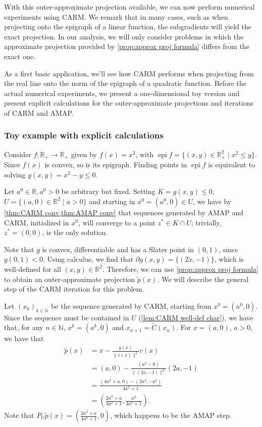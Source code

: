 \documentclass[smallextended,numbook,nospthms]{svjour3}
\theoremstyle{plain}
\theoremstyle{definition}
\def\RR{\mathds R}
\def\NN{\mathds N}
\DeclareMathOperator{\epi}{epi}
\begin{document}
With this outer-approximate projection available, we can now perform numerical experiments using CARM. We remark that in many cases, such as when projecting onto the epigraph of a linear function, the subgradients will yield the exact projection. In our analysis, we will only consider problems in which the approximate projection provided by \cref{prop:approx proj formula} differs from the exact one.

As a first basic application, we'll see how CARM performs when projecting from the real line onto the norm of the epigraph of a quadratic function. Before the actual numerical experiments, we present a one-dimensional toy version and present explicit calculations for the outer-approximate projections and iterations of CARM and AMAP.

\subsubsection{Toy example with explicit calculations}
Consider $f:\RR_{+} \rightarrow \RR_{+}$ given by $f(x)=x^2$, with $\epi f = \{(x,y) \in \RR^{2}_{+} \mid x^2 \leq y\}$. Since $f(x)$ is convex, so is its epigraph. Finding points in $\epi f$ is equivalent to solving $g(x,y)=x^2-y \leq 0$.

Let $a^0 \in \RR, a^0>0$ be arbitrary but fixed. Setting $K = g(x,y) \leq 0$, $U = \{(a,0) \in \RR^{2} \mid a>0\}$ and starting in $x^0=(a^0,0) \in U$, we have by \cref{thm:CARM conv,thm:AMAP conv} that sequences generated by AMAP and CARM, initialized in $x^0$, will converge to a point $z^* \in K \cap U$; trivially, $z^*=(0,0)$, is the only solution.

Note that $g$ is convex, differentiable and has a Slater point in $(0,1)$, since $g(0,1)<0$. Using calculus, we find that $\partial g(x,y)=\{(2x,-1)\}$, which is well-defined for all $(x,y) \in \RR^{2}$. Therefore, we can use \cref{prop:approx proj formula} to obtain an outer-approximate projection $\tilde{p}(x)$. We will describe the general step of the CARM iteration for this problem.

Let $(x_k)_{k \in \NN}$ be the sequence generated by CARM, starting from $x^0=(a^0,0)$. Since the sequence must be contained in $U$ (\cref{lem:CARM well-def char}), we have that, for any $n \in \NN$, $x^k=(a^k,0)$ and $x_{n+1}=\tilde{C}(x_{n})$.
For $x=(a,0)$, $a>0$, we have that
\begin{align}
\tilde{p}(x)&=x-\frac{g(x)}{\|v(x)\|^{2}} v(x) \\
			&=(a,0) - \frac{(a^2-0)}{\|(2a,-1)\|^2}(2a,-1) \\
			&=\frac{(4a^3+a,0) - (2a^3,-a^2)}{4a^2+1} \\
			&=\left(\frac{2a^3+a}{4a^2+1},\frac{a^2}{4a^2+1}\right).
\end{align}
Note that $P_{U}\tilde{p}(x)=\left(\frac{2a^3+a}{4a^2+1},0\right)$, which happens to be the AMAP step.
\end{document}

